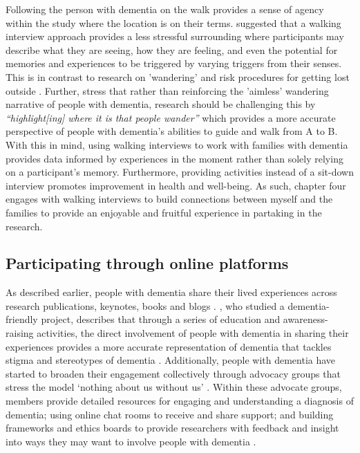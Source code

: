 Following the person with dementia on the walk provides a sense of agency within the study where the location is on their terms. \cite{kullberg2017walking}  suggested that a walking interview approach provides a less stressful surrounding where participants may describe what they are seeing, how they are feeling, and even the potential for memories and experiences to be triggered by varying triggers from their senses. This is in contrast to research on 'wandering' and risk procedures for getting lost outside \citep{odzakovic2020verjoyed}. Further, \cite{brittain2017walking} stress that rather than reinforcing the 'aimless' wandering narrative of people with dementia, research should be challenging this by \textit{``highlight[ing] where it is that people wander''} which provides a more accurate perspective of people with dementia's abilities to guide and walk from A to B. With this in mind, using walking interviews to work with families with dementia provides data informed by experiences in the moment rather than solely relying on a participant's memory. Furthermore, providing activities instead of a sit-down interview promotes improvement in health and well-being. As such, chapter four engages with walking interviews to build connections between myself and the families to provide an enjoyable and fruitful experience in partaking in the research.

\subsection{Participating through online platforms}
\label{PD:onlinePlatform}
As described earlier, people with dementia share their lived experiences across research publications, keynotes, books and blogs \citep{bryden_challenging_2020, shakespeare_rights_2019}. \cite{phillipson2019involvement}, who studied a dementia-friendly project, describes that through a series of education and awareness-raising activities, the direct involvement of people with dementia in sharing their experiences provides a more accurate representation of dementia that tackles stigma and stereotypes of dementia \citep{herrmann_systematic_2018}. Additionally, people with dementia have started to broaden their engagement collectively through advocacy groups that stress the model `nothing about us without us' \citep{oldfield2021nothing}. Within these advocate groups, members provide detailed resources for engaging and understanding a diagnosis of dementia; using online chat rooms to receive and share support; and building frameworks and ethics boards to provide researchers with feedback and insight into ways they may want to involve people with dementia \citep{davies2021dementia}.


